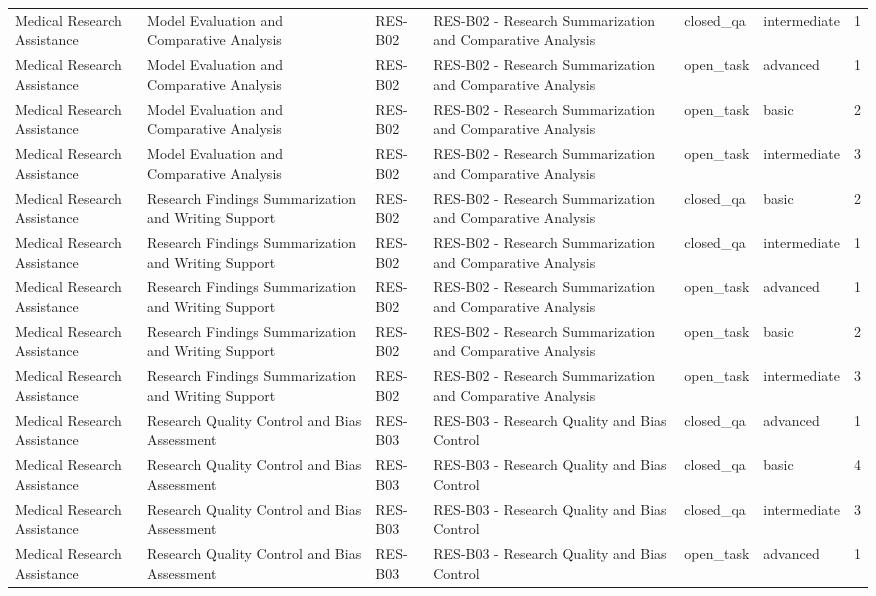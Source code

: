 \begin{tabular}{llllllr}
Medical Research Assistance & Model Evaluation and Comparative Analysis & RES-B02 & RES-B02 - Research Summarization and Comparative Analysis & closed_qa & intermediate & 1 \\
Medical Research Assistance & Model Evaluation and Comparative Analysis & RES-B02 & RES-B02 - Research Summarization and Comparative Analysis & open_task & advanced & 1 \\
Medical Research Assistance & Model Evaluation and Comparative Analysis & RES-B02 & RES-B02 - Research Summarization and Comparative Analysis & open_task & basic & 2 \\
Medical Research Assistance & Model Evaluation and Comparative Analysis & RES-B02 & RES-B02 - Research Summarization and Comparative Analysis & open_task & intermediate & 3 \\
Medical Research Assistance & Research Findings Summarization and Writing Support & RES-B02 & RES-B02 - Research Summarization and Comparative Analysis & closed_qa & basic & 2 \\
Medical Research Assistance & Research Findings Summarization and Writing Support & RES-B02 & RES-B02 - Research Summarization and Comparative Analysis & closed_qa & intermediate & 1 \\
Medical Research Assistance & Research Findings Summarization and Writing Support & RES-B02 & RES-B02 - Research Summarization and Comparative Analysis & open_task & advanced & 1 \\
Medical Research Assistance & Research Findings Summarization and Writing Support & RES-B02 & RES-B02 - Research Summarization and Comparative Analysis & open_task & basic & 2 \\
Medical Research Assistance & Research Findings Summarization and Writing Support & RES-B02 & RES-B02 - Research Summarization and Comparative Analysis & open_task & intermediate & 3 \\
Medical Research Assistance & Research Quality Control and Bias Assessment & RES-B03 & RES-B03 - Research Quality and Bias Control & closed_qa & advanced & 1 \\
Medical Research Assistance & Research Quality Control and Bias Assessment & RES-B03 & RES-B03 - Research Quality and Bias Control & closed_qa & basic & 4 \\
Medical Research Assistance & Research Quality Control and Bias Assessment & RES-B03 & RES-B03 - Research Quality and Bias Control & closed_qa & intermediate & 3 \\
Medical Research Assistance & Research Quality Control and Bias Assessment & RES-B03 & RES-B03 - Research Quality and Bias Control & open_task & advanced & 1 \\

\end{tabular}
